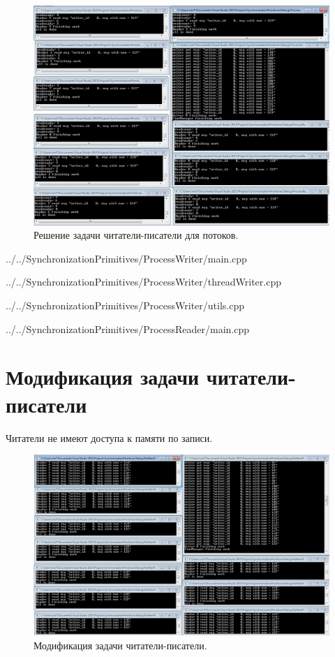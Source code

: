 \documentclass[a4paper, 12pt]{article}		%
\begin{document}
\begin{figure}[h!]
\centering
\includegraphics[scale=0.50]{res/007}
\caption{Решение задачи читатели-писатели для потоков.}
\end{figure}


{../../SynchronizationPrimitives/ProcessWriter/main.cpp}


{../../SynchronizationPrimitives/ProcessWriter/threadWriter.cpp}


{../../SynchronizationPrimitives/ProcessWriter/utils.cpp}


{../../SynchronizationPrimitives/ProcessReader/main.cpp}


\newpage
\section{Модификация задачи читатели-писатели}

Читатели не имеют доступа к памяти по записи.

\begin{figure}[h!]
\centering
\includegraphics[scale=0.50]{res/008}
\caption{Модификация задачи читатели-писатели.}
\end{figure}
\end{document}
